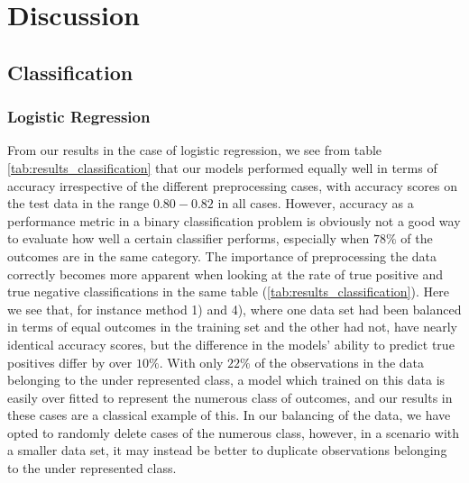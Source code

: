 \section{Discussion}\label{sec:Discussion}
\subsection{Classification}
\subsubsection{Logistic Regression}
From our results in the case of logistic regression, we see from table \ref{tab:results_classification} that our models performed equally well in terms of accuracy irrespective of the different preprocessing cases, with accuracy scores on the test data in the range $0.80 - 0.82$ in all cases. However, accuracy as a performance metric in a binary classification problem is obviously not a good way to evaluate how well a certain classifier performs, especially when $78\%$ of the outcomes are in the same category. The importance of preprocessing the data correctly becomes more apparent when looking at the rate of true positive and true negative classifications in the same table (\ref{tab:results_classification}). Here we see that, for instance method 1) and 4), where one data set had been balanced in terms of equal outcomes in the training set and the other had not, have nearly identical accuracy scores, but the difference in the models' ability to predict true positives differ by over $10\%$. With only $22\%$ of the observations in the data belonging to the under represented class, a model which trained on this data is easily over fitted to represent the numerous class of outcomes, and our results in these cases are a classical example of this. In our balancing of the data, we have opted to randomly delete cases of the numerous class, however, in a scenario with a smaller data set, it may instead be better to duplicate observations belonging to the under represented class.


